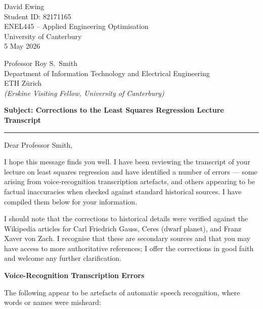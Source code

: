 \documentclass[11pt,a4paper]{article}
\begin{document}
\vspace*{0.5em}

{\raggedleft
David Ewing\\
Student ID: 82171165\\
ENEL445 -- Applied Engineering Optimisation\\
University of Canterbury\\[0.3em]
5 May 2026\par
}

\vspace{1.2em}

Professor Roy S.\ Smith\\
Department of Information Technology and Electrical Engineering\\
ETH Z\"urich\\[0.3em]
\textit{(Erskine Visiting Fellow, University of Canterbury)}

\vspace{1.8em}

\textbf{Subject: Corrections to the Least Squares Regression Lecture Transcript}

\vspace{0.4em}
\noindent\textcolor{rulegrey}{\rule{\textwidth}{0.4pt}}
\vspace{0.8em}

Dear Professor Smith,

I hope this message finds you well. I have been reviewing the transcript of your lecture on least squares regression and have identified a number of errors --- some arising from voice-recognition transcription artefacts, and others appearing to be factual inaccuracies when checked against standard historical sources. I have compiled them below for your information.

I should note that the corrections to historical details were verified against the Wikipedia articles for Carl Friedrich Gauss, Ceres (dwarf planet), and Franz Xaver von Zach. I recognise that these are secondary sources and that you may have access to more authoritative references; I offer the corrections in good faith and welcome any further clarification.

\vspace{0.6em}
\textbf{\large Voice-Recognition Transcription Errors}
\vspace{0.3em}

The following appear to be artefacts of automatic speech recognition, where words or names were misheard:
\end{document}
